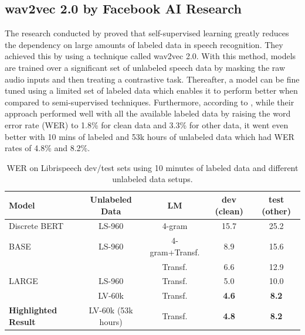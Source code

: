 \subsection{wav2vec 2.0 by Facebook AI Research}
The research conducted by \textcite{baevski2020wav2vec} proved that self-supervised learning greatly reduces the dependency on large amounts of labeled data in speech recognition. They achieved this by using a technique called wav2vec 2.0. With this method, models are trained over a significant set of unlabeled speech data by masking the raw audio inputs and then treating a contrastive task. Thereafter, a model can be fine tuned using a limited set of labeled data which enables it to perform better when compared to semi-supervised techniques. Furthermore, according to \textcite{baevski2020wav2vec}, while their approach performed well with all the available labeled data by raising the word error rate (WER) to 1.8\% for clean data and 3.3\% for other data, it went even better with 10 mins of labeled and 53k hours of unlabeled data which had WER rates of 4.8\% and 8.2\%.
\begin{table}[h!]
    \centering
    \caption{WER on Librispeech dev/test sets using 10 minutes of labeled data and different unlabeled data setups.}
    \begin{tabular}{@{}lcccc@{}}
    \toprule
    \textbf{Model}      & \textbf{Unlabeled Data} & \textbf{LM} & \textbf{dev (clean)} & \textbf{test (other)} \\ \midrule
    Discrete BERT  & LS-960                 & 4-gram  & 15.7           & 25.2           \\
    BASE                                     & LS-960                 & 4-gram+Transf. & 8.9            & 15.6           \\
                                             &                        & Transf.        & 6.6            & 12.9           \\
    LARGE                                    & LS-960                 & Transf.        & 5.0            & 10.0           \\
                                             & LV-60k                 & Transf.        & \textbf{4.6}   & \textbf{8.2}   \\ \midrule
    \textbf{Highlighted Result}     & LV-60k (53k hours)     & Transf.        & \textbf{4.8}   & \textbf{8.2}   \\ \bottomrule
    \end{tabular}
    \end{table}

